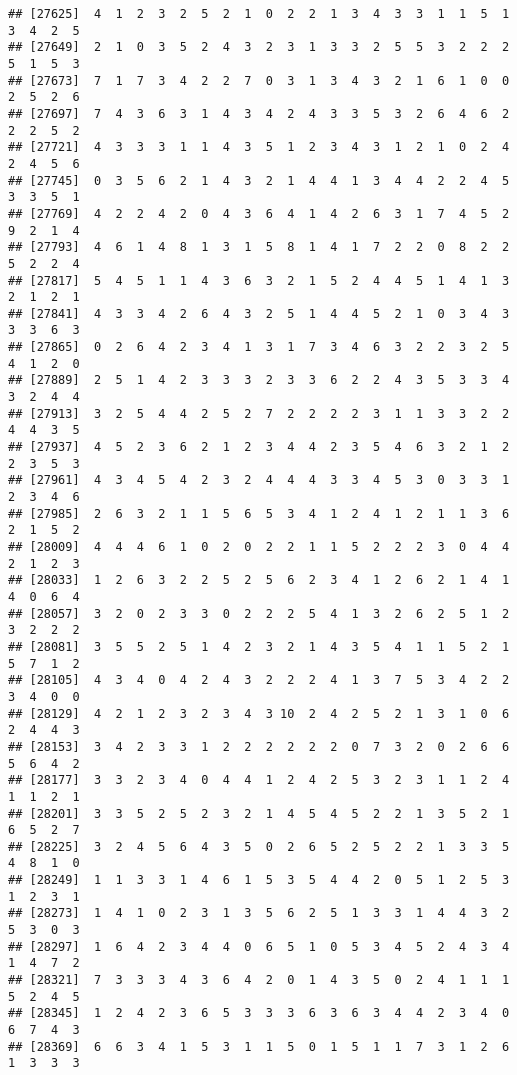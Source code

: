 \documentclass[
]{article}
\begin{document}
\begin{verbatim}
## [27625]  4  1  2  3  2  5  2  1  0  2  2  1  3  4  3  3  1  1  5  1  3  4  2  5
## [27649]  2  1  0  3  5  2  4  3  2  3  1  3  3  2  5  5  3  2  2  2  5  1  5  3
## [27673]  7  1  7  3  4  2  2  7  0  3  1  3  4  3  2  1  6  1  0  0  2  5  2  6
## [27697]  7  4  3  6  3  1  4  3  4  2  4  3  3  5  3  2  6  4  6  2  2  2  5  2
## [27721]  4  3  3  3  1  1  4  3  5  1  2  3  4  3  1  2  1  0  2  4  2  4  5  6
## [27745]  0  3  5  6  2  1  4  3  2  1  4  4  1  3  4  4  2  2  4  5  3  3  5  1
## [27769]  4  2  2  4  2  0  4  3  6  4  1  4  2  6  3  1  7  4  5  2  9  2  1  4
## [27793]  4  6  1  4  8  1  3  1  5  8  1  4  1  7  2  2  0  8  2  2  5  2  2  4
## [27817]  5  4  5  1  1  4  3  6  3  2  1  5  2  4  4  5  1  4  1  3  2  1  2  1
## [27841]  4  3  3  4  2  6  4  3  2  5  1  4  4  5  2  1  0  3  4  3  3  3  6  3
## [27865]  0  2  6  4  2  3  4  1  3  1  7  3  4  6  3  2  2  3  2  5  4  1  2  0
## [27889]  2  5  1  4  2  3  3  3  2  3  3  6  2  2  4  3  5  3  3  4  3  2  4  4
## [27913]  3  2  5  4  4  2  5  2  7  2  2  2  2  3  1  1  3  3  2  2  4  4  3  5
## [27937]  4  5  2  3  6  2  1  2  3  4  4  2  3  5  4  6  3  2  1  2  2  3  5  3
## [27961]  4  3  4  5  4  2  3  2  4  4  4  3  3  4  5  3  0  3  3  1  2  3  4  6
## [27985]  2  6  3  2  1  1  5  6  5  3  4  1  2  4  1  2  1  1  3  6  2  1  5  2
## [28009]  4  4  4  6  1  0  2  0  2  2  1  1  5  2  2  2  3  0  4  4  2  1  2  3
## [28033]  1  2  6  3  2  2  5  2  5  6  2  3  4  1  2  6  2  1  4  1  4  0  6  4
## [28057]  3  2  0  2  3  3  0  2  2  2  5  4  1  3  2  6  2  5  1  2  3  2  2  2
## [28081]  3  5  5  2  5  1  4  2  3  2  1  4  3  5  4  1  1  5  2  1  5  7  1  2
## [28105]  4  3  4  0  4  2  4  3  2  2  2  4  1  3  7  5  3  4  2  2  3  4  0  0
## [28129]  4  2  1  2  3  2  3  4  3 10  2  4  2  5  2  1  3  1  0  6  2  4  4  3
## [28153]  3  4  2  3  3  1  2  2  2  2  2  2  0  7  3  2  0  2  6  6  5  6  4  2
## [28177]  3  3  2  3  4  0  4  4  1  2  4  2  5  3  2  3  1  1  2  4  1  1  2  1
## [28201]  3  3  5  2  5  2  3  2  1  4  5  4  5  2  2  1  3  5  2  1  6  5  2  7
## [28225]  3  2  4  5  6  4  3  5  0  2  6  5  2  5  2  2  1  3  3  5  4  8  1  0
## [28249]  1  1  3  3  1  4  6  1  5  3  5  4  4  2  0  5  1  2  5  3  1  2  3  1
## [28273]  1  4  1  0  2  3  1  3  5  6  2  5  1  3  3  1  4  4  3  2  5  3  0  3
## [28297]  1  6  4  2  3  4  4  0  6  5  1  0  5  3  4  5  2  4  3  4  1  4  7  2
## [28321]  7  3  3  3  4  3  6  4  2  0  1  4  3  5  0  2  4  1  1  1  5  2  4  5
## [28345]  1  2  4  2  3  6  5  3  3  3  6  3  6  3  4  4  2  3  4  0  6  7  4  3
## [28369]  6  6  3  4  1  5  3  1  1  5  0  1  5  1  1  7  3  1  2  6  1  3  3  3

\end{verbatim}
\end{document}
